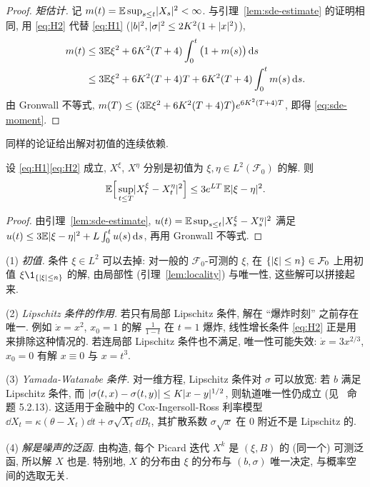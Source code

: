 \begin{proof}
\emph{矩估计.} 记 $m(t)=\mathbb{E}\sup_{s\le t}\lvert X_s\rvert^2<\infty$. 与引理~\ref{lem:sde-estimate} 的证明相同, 用 \eqref{eq:H2} 代替 \eqref{eq:H1} ($\lvert b\rvert^2,\lvert\sigma\rvert^2\le2K^2(1+\lvert x\rvert^2)$),
\begin{align*}
m(t)&\le3\mathbb{E}\xi^2+6K^2(T+4)\int_0^t\big(1+m(s)\big)\mathop{}\!\mathrm{d} s\\
&\le3\mathbb{E}\xi^2+6K^2(T+4)T+6K^2(T+4)\int_0^tm(s)\mathop{}\!\mathrm{d} s.
\end{align*}
由 Gronwall 不等式, $m(T)\le\big(3\mathbb{E}\xi^2+6K^2(T+4)T\big)e^{6K^2(T+4)T}$, 即得 \eqref{eq:sde-moment}.
\end{proof}

同样的论证给出解对初值的连续依赖.

\begin{proposition}[对初值的连续依赖]\label{prop:sde-continuity}
设 \eqref{eq:H1}\eqref{eq:H2} 成立, $X^\xi$, $X^\eta$ 分别是初值为 $\xi,\eta\in L^2(\mathcal{F}_0)$ 的解. 则
\[
\mathbb{E}\Big[\sup_{t\le T}\lvert X^\xi_t-X^\eta_t\rvert^2\Big]\le3e^{LT}\,\mathbb{E}\lvert\xi-\eta\rvert^2.
\]
\end{proposition}

\begin{proof}
由引理~\ref{lem:sde-estimate}, $u(t)=\mathbb{E}\sup_{s\le t}\lvert X^\xi_s-X^\eta_s\rvert^2$ 满足 $u(t)\le3\mathbb{E}\lvert\xi-\eta\rvert^2+L\int_0^tu(s)\mathop{}\!\mathrm{d} s$, 再用 Gronwall 不等式.
\end{proof}

\begin{remark}
(1) \emph{初值.} 条件 $\xi\in L^2$ 可以去掉: 对一般的 $\mathcal{F}_0$-可测的 $\xi$, 在 $\{\lvert\xi\rvert\le n\}\in\mathcal{F}_0$ 上用初值 $\xi\1_{\{\abs{\xi}\le n\}}$ 的解, 由局部性 (引理~\ref{lem:locality}) 与唯一性, 这些解可以拼接起来.

(2) \emph{Lipschitz 条件的作用.} 若只有局部 Lipschitz 条件, 解在 ``爆炸时刻'' 之前存在唯一. 例如 $\dot{x}=x^2$, $x_0=1$ 的解 $\frac{1}{1-t}$ 在 $t=1$ 爆炸, 线性增长条件 \eqref{eq:H2} 正是用来排除这种情况的. 若连局部 Lipschitz 条件也不满足, 唯一性可能失效: $\dot{x}=3x^{2/3}$, $x_0=0$ 有解 $x\equiv0$ 与 $x=t^3$.

(3) \emph{Yamada-Watanabe 条件.} 对一维方程, Lipschitz 条件对 $\sigma$ 可以放宽: 若 $b$ 满足 Lipschitz 条件, 而 $\lvert\sigma(t,x)-\sigma(t,y)\rvert\le K\lvert x-y\rvert^{1/2}$, 则轨道唯一性仍成立 (见~\cite{karatzas} 命题 5.2.13). 这适用于金融中的 Cox-Ingersoll-Ross 利率模型 $\dd X_t=\kappa(\theta-X_t)\dd t+\sigma\sqrt{X_t}\dd B_t$, 其扩散系数 $\sigma\sqrt{x}$ 在 $0$ 附近不是 Lipschitz 的.

(4) \emph{解是噪声的泛函.} 由构造, 每个 Picard 迭代 $X^k$ 是 $(\xi,B)$ 的 (同一个) 可测泛函, 所以解 $X$ 也是. 特别地, $X$ 的分布由 $\xi$ 的分布与 $(b,\sigma)$ 唯一决定, 与概率空间的选取无关.
\end{remark}

